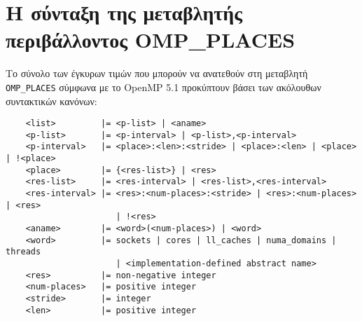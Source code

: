 \chapter{Η σύνταξη της μεταβλητής περιβάλλοντος OMP\_PLACES}
\label{app:OMP_Places syntax}
Το σύνολο των έγκυρων τιμών που μπορούν να ανατεθούν στη μεταβλητή \texttt{OMP\_PLACES} σύμφωνα με το OpenMP 5.1 \cite{openmp51} προκύπτουν βάσει των ακόλουθων συντακτικών κανόνων:
\begin{verbatim}
	<list>         |= <p-list> | <aname>
	<p-list>       |= <p-interval> | <p-list>,<p-interval>
	<p-interval>   |= <place>:<len>:<stride> | <place>:<len> | <place> | !<place>
	<place>        |= {<res-list>} | <res>
	<res-list>     |= <res-interval> | <res-list>,<res-interval>
	<res-interval> |= <res>:<num-places>:<stride> | <res>:<num-places> | <res>
	                  | !<res>
	<aname>        |= <word>(<num-places>) | <word>
	<word>         |= sockets | cores | ll_caches | numa_domains | threads
	                  | <implementation-defined abstract name>
	<res>          |= non-negative integer
	<num-places>   |= positive integer
	<stride>       |= integer
	<len>          |= positive integer
\end{verbatim}